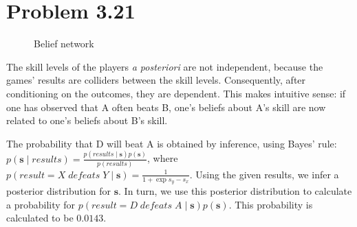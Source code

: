 \documentclass[11pt,a4paper,oneside]{report}
\begin{document}
\section*{Problem 3.21}

\begin{figure}[H]
  \centering
    \caption{Belief network}
    \label{fig:BinGame_DAG}    
\end{figure}

The skill levels of the players \emph{a posteriori} are not independent, because
the games' results are colliders between the skill levels. Consequently, after
conditioning on the outcomes, they are dependent. This makes intuitive sense: if
one has observed that A often beats B, one's beliefs about A's skill are now related to
one's beliefs about B's skill.

The probability that D will beat A is obtained by inference, using Bayes' rule: $p(\mathbf{s} \; | \;
results) = \frac{p(results \; | \; \mathbf{s}) p(\mathbf{s})}{p(results)}$, where
$p(result = X \; defeats \; Y \; | \; \mathbf{s}) = \frac{1}{1 + \exp{s_y - s_x}}$. Using the
given results, we infer a posterior distribution for $\mathbf{s}$. In turn, we use this posterior
distribution to calculate a probability for $p(result = D \; defeats \; A \; | \;
\mathbf{s}) p(\mathbf{s})$. This probability is calculated to be $0.0143$.
\end{document}
